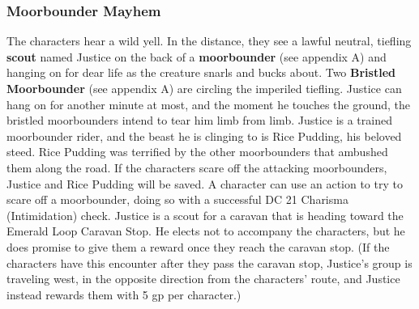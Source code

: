 \documentclass[10pt,a4,twoside,twocolumn,openany,nodeprecatedcode]{dndbook}
\begin{document}
\subsubsection{Moorbounder Mayhem}
The characters hear a wild yell. In the distance, they see a lawful neutral, tiefling \textbf{scout} named Justice on the back of a \textbf{moorbounder} (see appendix A) and hanging on for dear life as the creature snarls and bucks about. Two \textbf{Bristled Moorbounder} (see appendix A) are circling the imperiled tiefling. Justice can hang on for another minute at most, and the moment he touches the ground, the bristled moorbounders intend to tear him limb from limb.
Justice is a trained moorbounder rider, and the beast he is clinging to is Rice Pudding, his beloved steed. Rice Pudding was terrified by the other moorbounders that ambushed them along the road. If the characters scare off the attacking moorbounders, Justice and Rice Pudding will be saved. A character can use an action to try to scare off a moorbounder, doing so with a successful DC 21 Charisma (Intimidation) check.
Justice is a scout for a caravan that is heading toward the Emerald Loop Caravan Stop. He elects not to accompany the characters, but he does promise to give them a reward once they reach the caravan stop. (If the characters have this encounter after they pass the caravan stop, Justice's group is traveling west, in the opposite direction from the characters' route, and Justice instead rewards them with 5 gp per character.)
\end{document}
